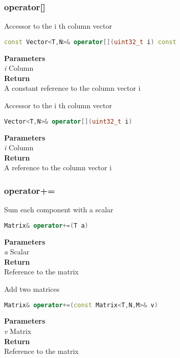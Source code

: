 \subsubsection{operator[]}
\begin{mdframed}
Accessor to the i th column vector
\begin{lstlisting}[language=C++]
const Vector<T,N>& operator[](uint32_t i) const 
\end{lstlisting}
\textbf{Parameters} \\ 
\textit{i} Column \\ 
\textbf{Return} \\ 
A constant reference to the column vector i\\ 
\end{mdframed}

\begin{mdframed}
Accessor to the i th column vector
\begin{lstlisting}[language=C++]
Vector<T,N>& operator[](uint32_t i) 
\end{lstlisting}
\textbf{Parameters} \\ 
\textit{i} Column \\ 
\textbf{Return} \\ 
A reference to the column vector i\\ 
\end{mdframed}

\subsubsection{operator+=}
\begin{mdframed}
Sum each component with a scalar
\begin{lstlisting}[language=C++]
Matrix& operator+=(T a)
\end{lstlisting}
\textbf{Parameters} \\ 
\textit{a} Scalar \\ 
\textbf{Return} \\ 
Reference to the matrix\\ 
\end{mdframed}

\begin{mdframed}
Add two matrices
\begin{lstlisting}[language=C++]
Matrix& operator+=(const Matrix<T,N,M>& v)
\end{lstlisting}
\textbf{Parameters} \\ 
\textit{v} Matrix \\ 
\textbf{Return} \\ 
Reference to the matrix\\ 
\end{mdframed}

